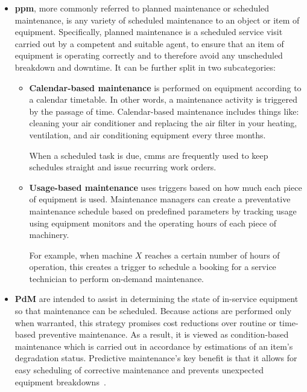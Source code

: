 \begin{itemize}
    \item \textbf{\ac{ppm}}, more commonly referred to planned maintenance
          or scheduled maintenance, is any variety of scheduled maintenance to an object or item of equipment. Specifically, planned maintenance is
          a scheduled service visit carried out by a competent and suitable agent, to ensure that an item of equipment is operating correctly and to
          therefore avoid any unscheduled breakdown and downtime. It can be further split in two subcategories:
          \begin{itemize}
              \item \textbf{Calendar-based maintenance} is performed on equipment according to a calendar timetable.
                    In other words, a maintenance activity is triggered by the passage of time.
                    Calendar-based maintenance includes things like: cleaning your air conditioner and replacing the air filter in your heating,
                    ventilation, and air conditioning equipment every three months.

                    When a scheduled task is due, \ac{cmms} are frequently used to keep schedules straight and issue recurring work orders.
              \item \textbf{Usage-based maintenance} uses triggers based on how much each piece of equipment is used.
                    Maintenance managers can create a preventative maintenance schedule based on predefined parameters by tracking usage
                    using equipment monitors and the operating hours of each piece of machinery.

                    For example, when machine $X$ reaches a certain number of hours of operation, this creates a trigger
                    to schedule a booking for a service technician to perform on-demand maintenance.
          \end{itemize}
    \item \textbf{\ac{PdM}} are intended to assist in determining the state of in-service equipment so that maintenance can be scheduled.
          Because actions are performed only when warranted, this strategy promises cost reductions over routine or time-based preventive maintenance.
          As a result, it is viewed as condition-based maintenance which is carried out in accordance by estimations of an item's degradation status.
          Predictive maintenance's key benefit is that it allows for easy scheduling of corrective maintenance and prevents unexpected equipment breakdowns~\cite{Misc:danielpenn_2020_what}.


\end{itemize}
